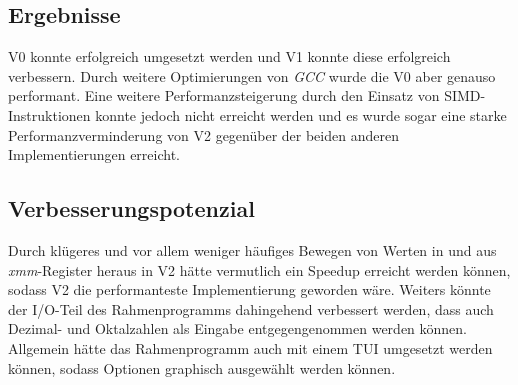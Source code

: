 \documentclass[course=erap]{aspdoc}
\begin{document}
\subsection{Ergebnisse}
V0 konnte erfolgreich umgesetzt werden und V1 konnte 
diese erfolgreich verbessern. Durch weitere Optimierungen von \emph{GCC} wurde die V0 aber
genauso performant.
Eine weitere Performanzsteigerung durch den Einsatz von SIMD-Instruktionen konnte jedoch nicht erreicht werden
und es wurde sogar eine starke Performanzverminderung von V2 gegenüber der beiden anderen Implementierungen erreicht.

\subsection{Verbesserungspotenzial}
Durch klügeres und vor allem weniger häufiges Bewegen von Werten in und aus \emph{xmm}-Register heraus
in V2 hätte vermutlich ein Speedup erreicht werden können, sodass V2 die performanteste Implementierung
geworden wäre.
Weiters könnte der I/O-Teil des Rahmenprogramms dahingehend verbessert werden, dass auch Dezimal- und
Oktalzahlen als Eingabe entgegengenommen werden können. Allgemein hätte das Rahmenprogramm auch mit einem 
TUI umgesetzt werden können, sodass Optionen graphisch ausgewählt werden können.




{}
\end{document}
